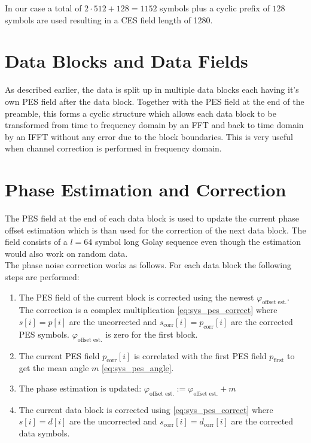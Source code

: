 In our case a total of $2 \cdot 512 + 128 = 1152$ symbols plus
a cyclic prefix of $128$ symbols are used resulting in a \gls{CES} field
length of 1280.

\section{Data Blocks and Data Fields}
As described earlier, the data is split up in multiple data blocks
each having it's own \gls{PES} field after the data block.
Together with the \gls{PES} field at the end of the preamble, this forms
a cyclic structure which allows each data block to be transformed
from time to frequency domain by an \gls{FFT} and back to time domain
by an \gls{IFFT} without any error due to the block boundaries.
This is very useful when channel correction is performed in frequency domain.

\section{Phase Estimation and Correction}
The \gls{PES} field at the end of each data block is used to update
the current phase offset estimation which is than used for the correction
of the next data block. The field consists of a $l=64$ symbol long Golay
sequence even though the estimation would also work on random data. \\

The phase noise correction works as follows. For each data block
the following steps are performed:

\begin{enumerate}
\item The \gls{PES} field of the current block is corrected
  using the newest $\varphi_{\text{offset est.}}$.
  The correction is a complex multiplication \eqref{eq:sys_pes_correct}
  where $s[i] = p[i]$ are the uncorrected and
  $s_{\text{corr}}[i] = p_{\text{corr}}[i]$ are the corrected \gls{PES} symbols.
  $\varphi_{\text{offset est.}}$ is zero for the first block.
\item The current \gls{PES} field $p_{\text{corr}}[i]$
  is correlated with the first \gls{PES} field $p_{\text{first}}$
  to get the mean angle $m$ \eqref{eq:sys_pes_angle}.
\item The phase estimation is updated:
  $\varphi_{\text{offset est.}} := \varphi_{\text{offset est.}} + m$
\item The current data block is corrected using \eqref{eq:sys_pes_correct}
  where $s[i] = d[i]$ are the uncorrected and
  $s_{\text{corr}}[i] = d_{\text{corr}}[i]$ are the corrected data symbols.
\end{enumerate}

